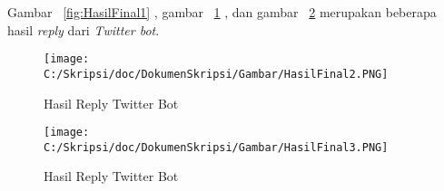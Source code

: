 \begin{enumerate}
	Gambar ~\ref{fig:HasilFinal1} , gambar ~\ref{fig:HasilFinal2} , dan gambar ~\ref{fig:HasilFinal3} merupakan beberapa hasil \textit{reply} dari \textit{Twitter bot}.
	
	
	\begin{figure}
		\centering
			\texttt{[image: C:/Skripsi/doc/DokumenSkripsi/Gambar/HasilFinal2.PNG]}
			\caption{Hasil Reply Twitter Bot}
		\label{fig:HasilFinal2}
	\end{figure}
	
	\begin{figure}
		\centering
			\texttt{[image: C:/Skripsi/doc/DokumenSkripsi/Gambar/HasilFinal3.PNG]}
			\caption{Hasil Reply Twitter Bot}
		\label{fig:HasilFinal3}
	\end{figure}
	
\end{enumerate}